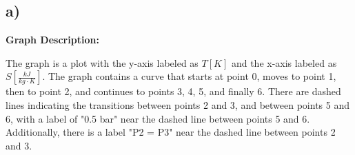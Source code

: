 

\subsection*{a)}

\begin{center}
\textbf{Graph Description:}

The graph is a plot with the y-axis labeled as \( T [K] \) and the x-axis labeled as \( S \left[ \frac{kJ}{kg \cdot K} \right] \). The graph contains a curve that starts at point 0, moves to point 1, then to point 2, and continues to points 3, 4, 5, and finally 6. There are dashed lines indicating the transitions between points 2 and 3, and between points 5 and 6, with a label of "0.5 bar" near the dashed line between points 5 and 6. Additionally, there is a label "P2 = P3" near the dashed line between points 2 and 3.
\end{center}